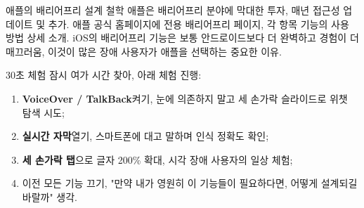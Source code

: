 \begin{tcbinfo}{애플의 배리어프리 설계 철학}
애플은 배리어프리 분야에 막대한 투자, 매년 접근성 업데이트 및 추가. 애플 공식 홈페이지에 전용 배리어프리 페이지, 각 항목 기능의 사용 방법 상세 소개. iOS의 배리어프리 기능은 보통 안드로이드보다 더 완벽하고 경험이 더 매끄러움, 이것이 많은 장애 사용자가 애플을 선택하는 중요한 이유.

\end{tcbinfo}

\begin{tcbpractice}{30초 체험}
잠시 여가 시간 찾아, 아래 체험 진행:

\begin{enumerate}
  \item \textbf{VoiceOver / TalkBack}켜기, 눈에 의존하지 말고 세 손가락 슬라이드로 위챗 탐색 시도;
  \item \textbf{실시간 자막}열기, 스마트폰에 대고 말하며 인식 정확도 확인;
  \item \textbf{세 손가락 탭}으로 글자 200\% 확대, 시각 장애 사용자의 일상 체험;
  \item 이전 모든 기능 끄기, "만약 내가 영원히 이 기능들이 필요하다면, 어떻게 설계되길 바랄까" 생각.
\end{enumerate}

\end{tcbpractice}
